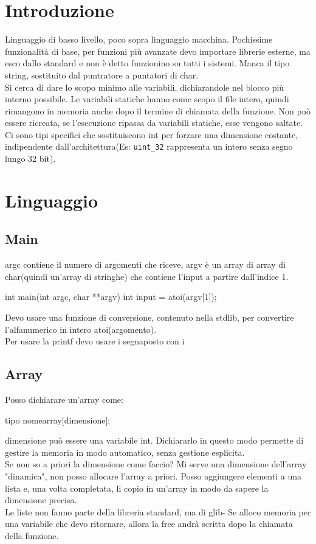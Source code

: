 \chapter{Introduzione}
Linguaggio di basso livello, poco sopra linguaggio macchina. Pochissime funzionalità di base, per funzioni più avanzate devo importare librerie esterne, ma esco dallo standard e non è detto funzionino su tutti i sistemi.
Manca il tipo string, sostituito dal puntratore a puntatori di char.\\
Si cerca di dare lo scopo minimo alle variabili, dichiarandole nel blocco più interno possibile. Le variabili statiche hanno come scopo il file intero, quindi rimangono in memoria anche dopo il termine di chiamata della funzione. Non può essere ricreata, se l'esecuzione ripassa da variabili statiche, esse vengono saltate.\\
Ci sono tipi specifici che sostituiscono int per forzare una dimensione costante, indipendente dall'architettura(Es: \verb|uint_32| rappresenta un intero senza segno lungo 32 bit).\\

\chapter{Linguaggio}
\section{Main}
argc contiene il numero di argomenti che riceve, argv è un array di array di char(quindi un'array di stringhe) che contiene l'input a partire dall'indice 1.

\begin{c}
int main(int argc, char **argv){
	int input = atoi(argv[1]);
}
\end{c}

Devo usare una funzione di conversione, contenuto nella stdlib, per convertire l'alfanumerico in intero atoi(argomento).\\
Per usare la printf devo usare i segnaposto con i %

\section{Array}
Posso dichiarare un'array come:

\begin{c}
tipo nomearray[dimensione];
\end{c}

dimensione può essere una variabile int. Dichiararlo in questo modo permette di gestire la memoria in modo automatico, senza gestione esplicita.\\
Se non so a priori la dimensione come faccio? Mi serve una dimensione dell'array "dinamica", non posso allocare l'array a priori. Posso aggiungere elementi a una lista e, una volta completata, li copio in un'array in modo da sapere la dimensione precisa.\\
Le liste non fanno parte della libreria standard, ma di glib-
Se alloco memoria per una variabile che devo ritornare, allora la free andrà scritta dopo la chiamata della funzione.

